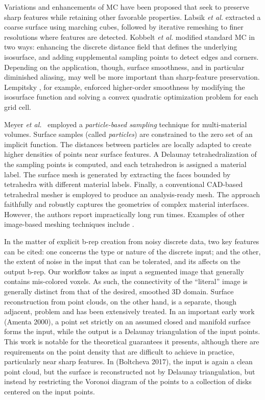 Variations and enhancements of MC have been proposed that seek to preserve sharp features while retaining other favorable properties.  Labsik \textit{et al.} \cite{labsik_2002} extracted a coarse surface using marching cubes, followed by iterative remeshing to finer resolutions where features are detected.  Kobbelt \textit{et al.} \cite{kobbelt_2001} modified standard MC in two ways:  enhancing the discrete distance field that defines the underlying isosurface, and adding supplemental sampling points to detect edges and corners. Depending on the application, though, surface smoothness, and in particular diminished aliasing, may well be more important than sharp-feature preservation. Lempitsky \cite{lempitsky_2010}, for example, enforced higher-order smoothness by modifying the isosurface function and solving a convex quadratic optimization problem for each grid cell.

Meyer \textit{et al.}~\cite{meyer_2008} employed a \textit{particle-based sampling} technique for multi-material volumes. Surface samples (called \textit{particles}) are constrained to the zero set of an implicit function. The distances between particles are locally adapted to create higher densities of points near surface features. A Delaunay tetrahedralization of the sampling points is computed, and each tetrahedron is assigned a material label. The surface mesh is generated by extracting the faces bounded by tetrahedra with different material labels. Finally, a conventional CAD-based tetrahedral mesher is employed to produce an analysis-ready mesh. The approach faithfully and robustly captures the geometries of complex material interfaces. However, the authors report impractically long run times.
Examples of other image-based meshing techniques include \cite{fang_2009, mohamed_2004, jermyn_2013, boissonnat_2009}.

In the matter of explicit b-rep creation from noisy discrete data, two key features can be cited:  one concerns the type or nature of the discrete input; and the other, the extent of noise in the input that can be tolerated, and its affects on the output b-rep.  Our workflow takes as input a segmented image that generally contains mis-colored voxels.  As such, the connectivity of the ``literal'' image is generally distinct from that of the desired, smoothed 3D domain.  Surface reconstruction from point clouds, on the other hand, is a separate, though adjacent, problem and has been extensively treated.  In an important early work (Amenta 2000), a point set strictly on an assumed closed and manifold surface forms the input, while the output is a Delaunay triangulation of the input points.  This work is notable for the theoretical guarantees it presents, although there are requirements on the point density that are difficult to achieve in practice, particularly near sharp features.  In (Boltcheva 2017), the input is again a clean point cloud, but the surface is reconstructed not by Delaunay triangulation, but instead by restricting the Voronoi diagram of the points to a collection of disks centered on the input points.  

